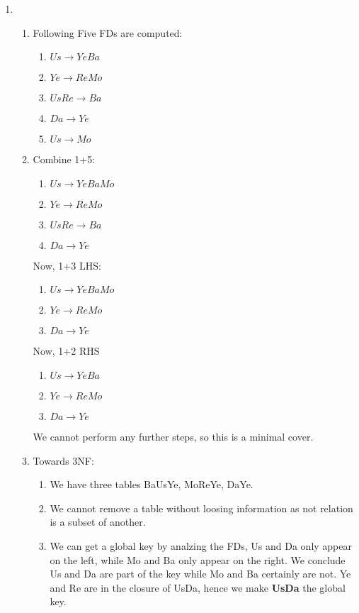 \documentclass[12pt]{extarticle}
\begin{document}
\begin{flushleft}
\begin{enumerate}
\item
\begin{enumerate}
\item Following Five FDs are computed:
\begin{enumerate}
\item $Us \rightarrow YeBa$
\item $Ye \rightarrow ReMo$
\item $UsRe \rightarrow Ba$
\item $Da \rightarrow Ye$
\item $Us \rightarrow Mo$
\end{enumerate}
\item 
Combine 1+5:
\begin{enumerate}
\item $Us \rightarrow YeBaMo$
\item $Ye \rightarrow ReMo$
\item $UsRe \rightarrow Ba$
\item $Da \rightarrow Ye$
\end{enumerate}
Now, 1+3 LHS:
\begin{enumerate}
\item $Us \rightarrow YeBaMo$
\item $Ye \rightarrow ReMo$
\item $Da \rightarrow Ye$
\end{enumerate}

Now, 1+2 RHS
\begin{enumerate}
\item $Us \rightarrow YeBa$
\item $Ye \rightarrow ReMo$
\item $Da \rightarrow Ye$
\end{enumerate}
We cannot perform any further steps, so this is a minimal cover.

 \item Towards 3NF:
 \begin{enumerate} \item 
We have three tables BaUsYe, MoReYe, DaYe.
 \item We cannot remove a table without loosing information as not relation is a subset of another.
 \item We can get a global key by analzing the FDs, Us and Da only appear on the left, while Mo and Ba only appear on the right. We conclude Us and Da are part of the key while Mo and Ba certainly are not. Ye and Re are in the closure of UsDa, hence we make \textbf{UsDa} the global key. 
 

\end{enumerate}
\end{enumerate}
\end{enumerate}
\end{flushleft}
\end{document}
